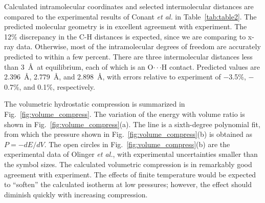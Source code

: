 \documentclass[prb,aps,nobibnotes,twocolumn,doublespace,twocolumngrid,superbib]{revtex4}
\begin{document}
Calculated intramolecular coordinates and selected intermolecular
distances are compared to the experimental results of Conant {\it et
al.}\cite{Conant_1979} in Table~\ref{tab:table2}.  The predicted
molecular geometry is in excellent agreement with experiment.  The
12\% discrepancy in the C-H distances is expected, since we are
comparing to x-ray data.  Otherwise, most of the intramolecular
degrees of freedom are accurately predicted to within a few percent.
There are three intermolecular distances less than 3~\AA\ at
equilibrium, each of which is an O$\cdot\cdot\cdot$H contact.
Predicted values are 2.396~\AA, 2.779~\AA, and 2.898~\AA, with errors
relative to experiment of $-$3.5\%, $-$0.7\%, and 0.1\%, respectively.

The volumetric hydrostatic compression is summarized in
Fig.~\ref{fig:volume_compress}.  The variation of the energy with
volume ratio is shown in Fig.~\ref{fig:volume_compress}(a).  The line
is a sixth-degree polynomial fit, from which the pressure shown in
Fig.~\ref{fig:volume_compress}(b) is obtained as $P=-dE/dV$.  The open
circles in Fig.~\ref{fig:volume_compress}(b) are the experimental data
of Olinger {\it et al.}, with experimental uncertainties smaller than
the symbol sizes.  The calculated volumetric compression is in
remarkably good agreement with experiment.  The effects of finite
temperature would be expected to ``soften'' the calculated isotherm at
low pressures; however, the effect should diminish quickly with
increasing compression.
\end{document}
